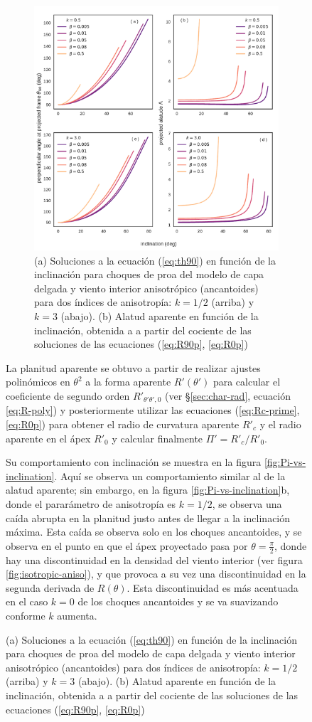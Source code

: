 \begin{figure}
\begin{figure}
  \centering
  \includegraphics[width=\linewidth]{./Figures/ancantoid-th90-vs-i}
  \caption{(a) Soluciones a la ecuación (\ref{eq:th90}) en función de la inclinación para choques de proa del modelo de capa delgada y viento interior anisotrópico (ancantoides) para dos índices de anisotropía: $k=1/2$ (arriba) y $k=3$ (abajo). (b) Alatud aparente en función de la inclinación, obtenida a a partir del cociente de las soluciones de las ecuaciones (\ref{eq:R90p}, \ref{eq:R0p})}
  \label{fig:t90-anisotropic}
\end{figure}

La planitud aparente se obtuvo a partir de realizar ajustes polinómicos en $\theta^2$ a la forma aparente $R'(\theta')$ para calcular el coeficiente de segundo orden $R'_{\theta'\theta', 0}$ (ver \S \ref{sec:char-rad}, ecuación \ref{eq:R-poly}) y posteriormente utilizar las ecuaciones (\ref{eq:Rc-prime}, \ref{eq:R0p}) para obtener el radio de curvatura aparente $R'_c$ y el radio aparente en el ápex $R'_0$ y calcular finalmente $\Pi'= R'_c/R'_0$. 

Su comportamiento con inclinación se muestra en la figura \ref{fig:Pi-vs-inclination}. Aquí se observa un comportamiento similar al de la alatud aparente; sin embargo, en la figura \ref{fig:Pi-vs-inclination}b, donde el pararámetro de anisotropía es $k=1/2$, se observa una caída abrupta en la planitud justo antes de llegar a la inclinación máxima. Esta caída se observa solo en los choques ancantoides, y se observa en el punto en que el ápex proyectado pasa por $\theta = \frac{\pi}{2}$, donde hay una discontinuidad en la densidad del viento interior (ver figura \ref{fig:isotropic-aniso}), y que provoca a su vez una discontinuidad en la segunda derivada de $R(\theta)$. Esta discontinuidad es más acentuada en el caso $k=0$ de los choques ancantoides y se va suavizando conforme $k$ aumenta.


\end{figure}
